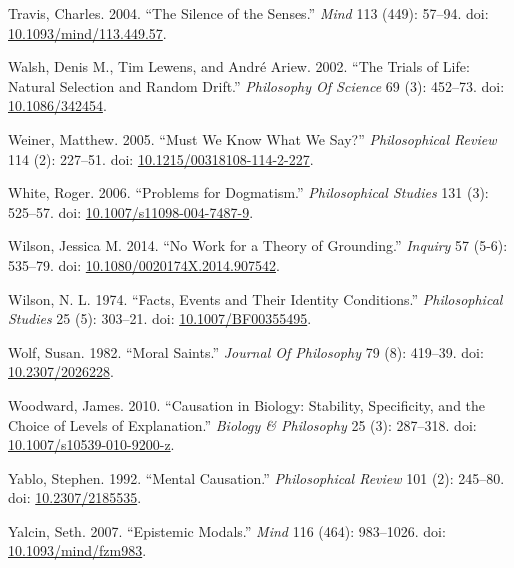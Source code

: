 \documentclass[
  10pt,
  letterpaper,
  DIV=11,
  numbers=noendperiod,
  twoside]{scrartcl}
\newlength{\cslhangindent}
\newenvironment{CSLReferences}[2] %
 {\begin{list}{}{%
  \setlength{\itemindent}{0pt}
  \setlength{\leftmargin}{0pt}
  \setlength{\parsep}{0pt}
  \ifodd #1
   \setlength{\leftmargin}{\cslhangindent}
   \setlength{\itemindent}{-1\cslhangindent}
  \fi
  \setlength{\itemsep}{#2\baselineskip}}}
 {\end{list}}
\begin{document}
\begin{CSLReferences}{1}{0}
Travis, Charles. 2004. {``The Silence of the Senses.''} \emph{Mind} 113
(449): 57--94. doi:
\href{https://doi.org/10.1093/mind/113.449.57}{10.1093/mind/113.449.57}.

Walsh, Denis M., Tim Lewens, and André Ariew. 2002. {``The Trials of
Life: Natural Selection and Random Drift.''} \emph{Philosophy Of
Science} 69 (3): 452--73. doi:
\href{https://doi.org/10.1086/342454}{10.1086/342454}.

Weiner, Matthew. 2005. {``Must We Know What We Say?''}
\emph{Philosophical Review} 114 (2): 227--51. doi:
\href{https://doi.org/10.1215/00318108-114-2-227}{10.1215/00318108-114-2-227}.

White, Roger. 2006. {``Problems for Dogmatism.''} \emph{Philosophical
Studies} 131 (3): 525--57. doi:
\href{https://doi.org/10.1007/s11098-004-7487-9}{10.1007/s11098-004-7487-9}.

Wilson, Jessica M. 2014. {``No Work for a Theory of Grounding.''}
\emph{Inquiry} 57 (5-6): 535--79. doi:
\href{https://doi.org/10.1080/0020174X.2014.907542}{10.1080/0020174X.2014.907542}.

Wilson, N. L. 1974. {``Facts, Events and Their Identity Conditions.''}
\emph{Philosophical Studies} 25 (5): 303--21. doi:
\href{https://doi.org/10.1007/BF00355495}{10.1007/BF00355495}.

Wolf, Susan. 1982. {``Moral Saints.''} \emph{Journal Of Philosophy} 79
(8): 419--39. doi:
\href{https://doi.org/10.2307/2026228}{10.2307/2026228}.

Woodward, James. 2010. {``Causation in Biology: Stability, Specificity,
and the Choice of Levels of Explanation.''} \emph{Biology \& Philosophy}
25 (3): 287--318. doi:
\href{https://doi.org/10.1007/s10539-010-9200-z}{10.1007/s10539-010-9200-z}.

Yablo, Stephen. 1992. {``Mental Causation.''} \emph{Philosophical
Review} 101 (2): 245--80. doi:
\href{https://doi.org/10.2307/2185535}{10.2307/2185535}.

Yalcin, Seth. 2007. {``Epistemic Modals.''} \emph{Mind} 116 (464):
983--1026. doi:
\href{https://doi.org/10.1093/mind/fzm983}{10.1093/mind/fzm983}.


\end{CSLReferences}
\end{document}
